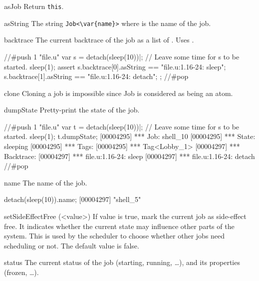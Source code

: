 \begin{urbiscriptapi}
\item[asJob]
  Return \lstinline|this|.

\item[asString] The string \lstinline|Job<\var{name}>| where  is
  the name of the job.

\item[backtrace] The current backtrace of the job as a list of
  .  Uses .

\begin{urbiscript}
//#push 1 "file.u"
var s = detach(sleep(10))|;
// Leave some time for s to be started.
sleep(1);
assert
{
  s.backtrace[0].asString == "file.u:1.16-24: sleep";
  s.backtrace[1].asString == "file.u:1.16-24: detach";
};
//#pop
\end{urbiscript}

\item[clone]
  Cloning a job is impossible since Job is considered as being an atom.

\item[dumpState]
  Pretty-print the state of the job.

\begin{urbiscript}
//#push 1 "file.u"
var t = detach(sleep(10))|;
// Leave some time for s to be started.
sleep(1);
t.dumpState;
[00004295] *** Job: shell_10
[00004295] ***   State: sleeping
[00004295] ***   Tags:
[00004295] ***     Tag<Lobby_1>
[00004297] ***   Backtrace:
[00004297] ***     file.u:1.16-24: sleep
[00004297] ***     file.u:1.16-24: detach
//#pop
\end{urbiscript}

\item[name]  The name of the job.
\begin{urbiscript}
detach(sleep(10)).name;
[00004297] "shell_5"
\end{urbiscript}

\item[setSideEffectFree](<value>)
  If value is true, mark the current job as side-effect free. It indicates
  whether the current state may influence other parts of the system. This is
  used by the scheduler to choose whether other jobs need scheduling or not.
  The default value is false.

\item[status]
  The current status of the job (starting, running, \ldots), and its
  properties (frozen, \ldots).


\end{urbiscriptapi}

